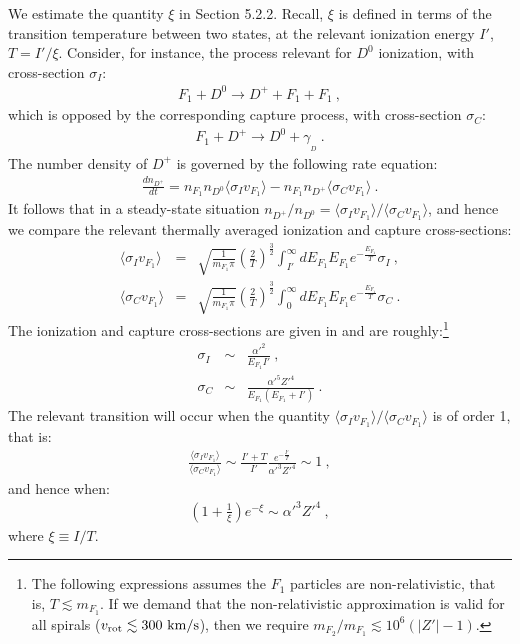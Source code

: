 \documentclass[12pt]{article}
\begin{document}
{{We estimate the quantity $\xi$ in Section 5.2.2. Recall, $\xi$ is defined in terms of the transition temperature between two states, at the relevant ionization energy $I'$, $T = I'/\xi$. Consider, for instance, the process relevant for $D ^0$ ionization, with cross-section $\sigma _I$:
%
\begin{eqnarray}
F_1 + D ^0 \rightarrow D ^+ + F_1 + F_1 \ ,
\label{ionziationd}
\end{eqnarray}
%
which is opposed by the corresponding capture process, with cross-section $\sigma _C$:
%
\begin{eqnarray}
F_1 + D ^+ \rightarrow D ^0 + \gamma _{_D} \ .
\label{captured}
\end{eqnarray}
%
The number density of $D ^+$ is governed by the following rate equation:
%
\begin{eqnarray}
\frac{dn _{D ^+}}{dt} = n _{F_1}n _{D ^0}\langle \sigma _Iv _{F_1}\rangle - n _{F_1}n _{D ^+}\langle \sigma _Cv _{F_1}\rangle \ .
\label{ratedp}
\end{eqnarray}
%
It follows that in a steady-state situation $n _{D ^+}/n _{D ^0}=\langle \sigma _Iv _{F_1} \rangle/\langle \sigma _Cv _{F_1} \rangle$, and hence we compare the relevant thermally averaged ionization and capture cross-sections:
%
\begin{eqnarray}
\langle \sigma _Iv _{F_1} \rangle &=& \sqrt{\frac{1}{m _{F_1}\pi}}\left (\frac{2}{T}\right ) ^{\frac{3}{2}}\int _{I'} ^{\infty} dE _{F_1}E _{F_1}e ^{-\frac{E _{F_1}}{T}}\sigma _I \ , \nonumber \\
\langle \sigma _Cv _{F_1} \rangle &=& \sqrt{\frac{1}{m _{F_1}\pi}}\left (\frac{2}{T}\right ) ^{\frac{3}{2}}\int _0 ^{\infty} dE _{F_1}E _{F_1}e ^{-\frac{E _{F_1}}{T}}\sigma _C \ .
\label{sigivsigcv}
\end{eqnarray}
%
The ionization and capture cross-sections are given in \cite{lotz,kramers} and are roughly:\footnote{The following expressions assumes the $F_1$ particles are non-relativistic, that is, $T \lesssim m _{F_1}$. If we demand that the non-relativistic approximation is valid for all spirals ($v _{\text{rot}} \lesssim 300 \ \rm km/s$), then we require $m _{F_2}/m _{F_1} \lesssim 10 ^6(|Z'|-1)$.}
%
\begin{eqnarray}
\sigma _I & \sim & \frac{{\alpha '} ^2}{E_{F_1}I'} \ , \nonumber \\
\sigma _C & \sim & \frac{{\alpha '} ^5{Z'} ^4}{E _{F_1}(E _{F_1} + I')} \ .
\end{eqnarray}
%
The relevant transition will occur when the quantity $\langle \sigma _Iv _{F_1} \rangle / \langle \sigma _Cv _{F_1} \rangle$ is of order 1, that is:
%
\begin{eqnarray}
\frac{\langle \sigma _Iv _{F_1} \rangle}{\langle \sigma _Cv _{F_1} \rangle} \sim \frac{I'+T}{I'}\frac{e ^{-\frac{I'}{T}}}{{\alpha '} ^3{Z'} ^4} \sim 1 \ ,
\end{eqnarray}
%
and hence when:
%
\begin{eqnarray}
\left ( 1+\frac{1}{\xi} \right ) e ^{-\xi} \sim {\alpha '} ^3{Z'} ^4 \ ,
\label{xiexi}
\end{eqnarray}
%
where $\xi \equiv I/T$.

}}
\end{document}
